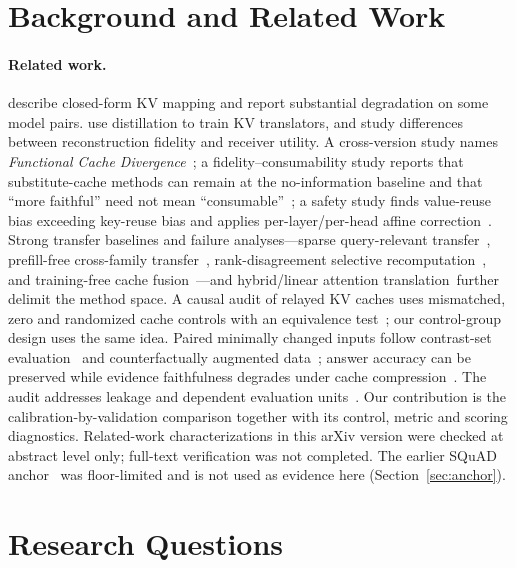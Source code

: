 \documentclass[11pt,twocolumn]{article}
\newcommand{\citeCacheDivergence}{\citep{n1}}
\newcommand{\citeFidelityConsumability}{\citep{n2}}
\newcommand{\citeValueReuse}{\citep{n3}}
\newcommand{\citeSparseTransfer}{\citep{n4}}
\newcommand{\citePrefillFree}{\citep{n5}}
\newcommand{\citeRankRecompute}{\citep{n6}}
\newcommand{\citeCacheAuditControls}{\citep{n7}}
\newcommand{\citeCacheFusion}{\citep{n8}}
\newcommand{\citeHybridAttention}{\citep{n9a,n9b}}
\begin{document}
\section{Background and Related Work}
\label{sec:related}

\paragraph{Related work.}
\citep{heo2026} describe closed-form KV mapping and report substantial
degradation on some model pairs. \citep{kvlingo} use distillation to train KV
translators, and \citep{cachelink} study differences between reconstruction
fidelity and receiver utility. A cross-version study names \emph{Functional
Cache Divergence}~\citeCacheDivergence; a fidelity--consumability study reports
that substitute-cache methods can remain at the no-information baseline and
that ``more faithful'' need not mean ``consumable''~\citeFidelityConsumability;
a safety study finds value-reuse bias exceeding key-reuse bias and applies
per-layer/per-head affine correction~\citeValueReuse. Strong transfer baselines
and failure analyses---sparse query-relevant transfer~\citeSparseTransfer,
prefill-free cross-family transfer~\citePrefillFree, rank-disagreement
selective recomputation~\citeRankRecompute, and training-free cache
fusion~\citeCacheFusion---and hybrid/linear attention
translation~\citeHybridAttention further delimit the method space. A causal
audit of relayed KV caches uses mismatched, zero and randomized cache controls
with an equivalence test~\citeCacheAuditControls; our control-group design
uses the same idea. Paired minimally changed inputs follow contrast-set
evaluation~\citep{contrastsets} and counterfactually augmented
data~\citep{kaushik2020}; answer accuracy can be preserved while evidence
faithfulness degrades under cache compression~\citep{acc_evidence}. The audit
addresses leakage and dependent evaluation units~\citep{kapoor2023}. Our
contribution is the calibration-by-validation comparison together with its
control, metric and scoring diagnostics. Related-work characterizations in
this arXiv version were checked at abstract level only; full-text verification
was not completed. The earlier SQuAD anchor~\citep{squad16,squad18} was
floor-limited and is not used as evidence here (Section~\ref{sec:anchor}).

\section{Research Questions}
\label{sec:rq}
\end{document}
